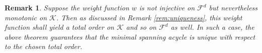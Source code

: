 \documentclass[12pt]{amsart}
\newcommand{\red}[1]{\textcolor{red}{#1}}
\renewcommand{\red}[1]{#1}
\newtheorem{remark}[theorem]{Remark}
\numberwithin{equation}{section}
\numberwithin{theorem}{section}
\newcommand{\1}{\mathbf{1}}
\def\F{\mathcal{F}}
\def\K{\mathcal{K}}
\begin{document}
%
\begin{remark}
\label{rem:uniqueness_msa}
Suppose the weight function $w$ is not injective on $\F^d$ but nevertheless monotonic on $\K$. Then as discussed in Remark \ref{rem:uniqueness}, this weight function shall yield a total order on $\K$ and so on $\F^d$ as well. In such a case, the above theorem guarantees that the minimal spanning acycle is unique with respect to the chosen total order. %
\end{remark}








% 	
%	
\end{document}

